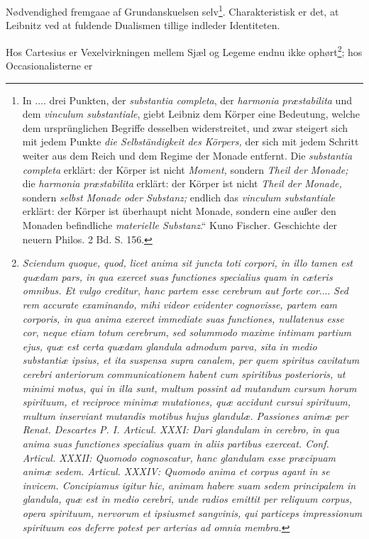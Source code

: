 \documentclass[12pt,a4paper]{book}
\begin{document}
\setcounter{footnote}{0}
Nødvendighed fremgaae af Grundanskuelsen selv\footnote{In .... drei Punkten, der
\textit{substantia completa}, der \textit{harmonia præstabilita} und dem
\textit{vinculum substantiale}, giebt Leibniz dem Körper eine Bedeutung, welche
dem ursprünglichen Begriffe desselben widerstreitet, und zwar steigert sich mit
jedem Punkte \emph{die Selbständigkeit des Körpers,} der sich mit jedem Schritt
weiter aus dem Reich und dem Regime der Monade entfernt. Die \textit{substantia
completa} erklärt: der Körper ist nicht \emph{Moment,} sondern \emph{Theil der
Monade;} die \textit{harmonia præstabilita} erklärt: der Körper ist nicht
\emph{Theil der Monade,} sondern \emph{selbst Monade oder Substanz;} endlich das
\textit{vinculum substantiale} erklärt: der Körper ist überhaupt nicht Monade,
sondern eine außer den Monaden befindliche \emph{materielle Substanz}.“ Kuno
Fischer. Geschichte der neuern Philos. 2 Bd. S. 156.}. Charakteristisk er det, at
Leibnitz ved at fuldende Dualismen tillige indleder Identiteten.

Hos Cartesius er Vexelvirkningen mellem Sjæl og Legeme endnu ikke
ophørt\footnote{\textit{Sciendum quoque, quod, licet anima sit juncta toti
corpori, in illo tamen est quædam pars, in qua exercet suas functiones specialius
quam in cæteris omnibus. Et vulgo creditur, hanc partem esse cerebrum aut forte
cor}.... \textit{Sed rem accurate examinando, mihi videor evidenter cognovisse,
partem eam corporis, in qua anima exercet immediate suas functiones, nullatenus
esse cor, neque etiam totum cerebrum, sed solummodo maxime intimam partium ejus,
quæ est certa quædam glandula admodum parva, sita in medio substantiæ ipsius, et
ita suspensa supra canalem, per quem spiritus cavitatum cerebri anteriorum
communicationem habent cum spiritibus posterioris, ut minimi motus, qui in illa
sunt, multum possint ad mutandum cursum horum spirituum, et reciproce minimæ
mutationes, quæ accidunt cursui spirituum, multum inserviant mutandis motibus
hujus glandulæ. Passiones animæ per Renat. Descartes P. I. Articul. XXXI: Dari
glandulam in cerebro, in qua anima suas functiones specialius quam in aliis
partibus exerceat. Conf. Articul. XXXII: Quomodo cognoscatur, hanc glandulam esse
præcipuam animæ sedem. Articul. XXXIV: Quomodo anima et corpus agant in se
invicem. Concipiamus igitur hic, animam habere suam sedem principalem in
glandula, quæ est in medio cerebri, unde radios emittit per reliquum corpus,
opera spirituum, nervorum et ipsiusmet sangvinis, qui particeps impressionum
spirituum eos deferre potest per arterias ad omnia membra.}}; hos
Occasionalisterne er
\end{document}
